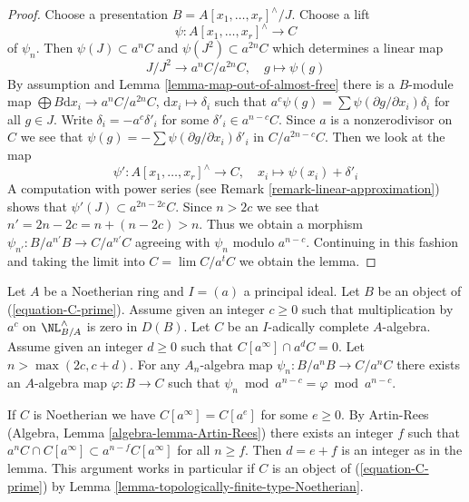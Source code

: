 \begin{proof}
Choose a presentation $B = A[x_1, \ldots, x_r]^\wedge/J$. Choose
a lift
$$
\psi : A[x_1, \ldots, x_r]^\wedge \to C
$$
of $\psi_n$. Then $\psi(J) \subset a^nC$ and $\psi(J^2) \subset a^{2n}C$
which determines a linear map
$$
J/J^2 \longrightarrow a^nC/a^{2n}C,\quad g \longmapsto \psi(g)
$$
By assumption and Lemma \ref{lemma-map-out-of-almost-free}
there is a $B$-module map
$\bigoplus B\text{d}x_i \to a^nC/a^{2n}C$,
$\text{d}x_i \mapsto \delta_i$ such that
$a^c \psi(g) = \sum \psi(\partial g/\partial x_i) \delta_i$
for all $g \in J$. Write $\delta_i = - a^c \delta'_i$ for some
$\delta'_i \in a^{n - c}C$. Since $a$ is a nonzerodivisor
on $C$ we see that $\psi(g) = - \sum \psi(\partial g/\partial x_i) \delta'_i$
in $C/a^{2n - c}C$.
Then we look at the map
$$
\psi' : A[x_1, \ldots, x_r]^\wedge \to C,\quad
x_i \longmapsto \psi(x_i) + \delta'_i
$$
A computation with power series (see Remark \ref{remark-linear-approximation})
shows that $\psi'(J) \subset a^{2n - 2c}C$. Since $n > 2c$
we see that $n' = 2n - 2c = n + (n - 2c) > n$. Thus we obtain a morphism
$\psi_{n'} : B/a^{n'}B \to C/a^{n'}C$ agreeing with $\psi_n$ modulo
$a^{n - c}$. Continuing in this fashion and taking the limit
into $C = \lim C/a^tC$ we obtain the lemma.
\end{proof}

\begin{lemma}
\label{lemma-get-morphism-principal}
Let $A$ be a Noetherian ring and $I = (a)$ a principal ideal.
Let $B$ be an object of (\ref{equation-C-prime}).
Assume given an integer $c \geq 0$ such that
multiplication by $a^c$ on $\NL_{B/A}^\wedge$ is zero in $D(B)$.
Let $C$ be an $I$-adically complete $A$-algebra.
Assume given an integer $d \geq 0$ such that $C[a^\infty] \cap a^dC = 0$.
Let $n > \max(2c, c + d)$. For any $A_n$-algebra map
$\psi_n : B/a^nB \to C/a^nC$ there exists an $A$-algebra map
$\varphi : B \to C$ such
that $\psi_n \bmod a^{n - c} = \varphi \bmod a^{n - c}$.
\end{lemma}

\noindent
If $C$ is Noetherian we have $C[a^\infty] = C[a^e]$ for some
$e \geq 0$. By Artin-Rees (Algebra, Lemma \ref{algebra-lemma-Artin-Rees})
there exists an integer $f$ such that
$a^nC \cap C[a^\infty] \subset a^{n - f}C[a^\infty]$ for all $n \geq f$.
Then $d = e + f$ is an integer as in the lemma. This argument
works in particular if $C$ is an object of (\ref{equation-C-prime})
by Lemma \ref{lemma-topologically-finite-type-Noetherian}.

